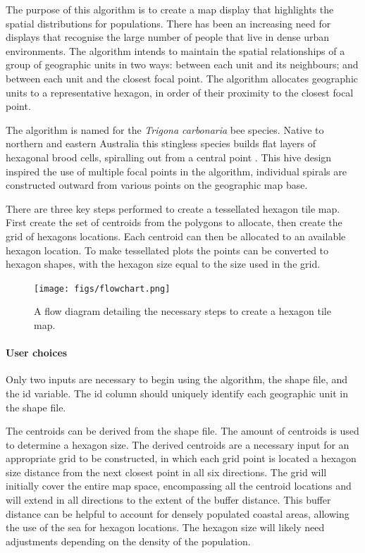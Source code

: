 The purpose of this algorithm is to create a map display that highlights
the spatial distributions for populations. There has been an increasing
need for displays that recognise the large number of people that live in
dense urban environments. The algorithm intends to maintain the spatial
relationships of a group of geographic units in two ways: between each
unit and its neighbours; and between each unit and the closest focal
point. The algorithm allocates geographic units to a representative
hexagon, in order of their proximity to the closest focal point.

The algorithm is named for the \emph{Trigona carbonaria} bee species.
Native to northern and eastern Australia this stingless species builds
flat layers of hexagonal brood cells, spiralling out from a central
point \citep{PH}. This hive design inspired the use of multiple focal
points in the algorithm, individual spirals are constructed outward from
various points on the geographic map base.

There are three key steps performed to create a tessellated hexagon tile
map. First create the set of centroids from the polygons to allocate,
then create the grid of hexagons locations. Each centroid can then be
allocated to an available hexagon location. To make tessellated plots
the points can be converted to hexagon shapes, with the hexagon size
equal to the size used in the grid.

\begin{figure}
\texttt{[image: figs/flowchart.png]}
\caption{\label{fig:sugarbag_flow}A flow diagram detailing the necessary steps to create a hexagon tile map.}
\end{figure}

\hypertarget{user-choices}{%
\paragraph{User choices}\label{user-choices}}

Only two inputs are necessary to begin using the algorithm, the shape
file, and the id variable. The id column should uniquely identify each
geographic unit in the shape file.

The centroids can be derived from the shape file. The amount of
centroids is used to determine a hexagon size. The derived centroids are
a necessary input for an appropriate grid to be constructed, in which
each grid point is located a hexagon size distance from the next closest
point in all six directions. The grid will initially cover the entire
map space, encompassing all the centroid locations and will extend in
all directions to the extent of the buffer distance. This buffer
distance can be helpful to account for densely populated coastal areas,
allowing the use of the sea for hexagon locations. The hexagon size will
likely need adjustments depending on the density of the population.

